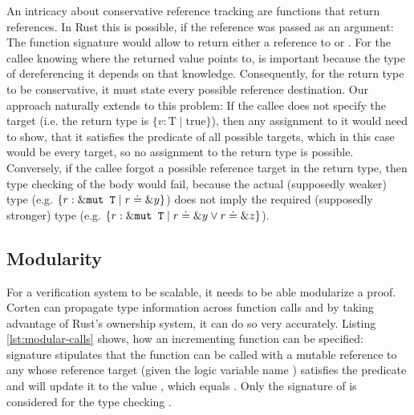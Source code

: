 \documentclass[twoside, english]{sdqthesis}
\theoremstyle{definition}
\begin{document}
An intricacy about conservative reference tracking are functions that return references. In Rust this is possible, if the reference was passed as an argument: The function signature  would allow  to return either a reference to  or . For the callee knowing where the returned value points to, is important because the type of dereferencing it depends on that knowledge. 
Consequently, for the return type to be conservative, it must state every possible reference destination.
Our approach naturally extends to this problem: If the callee does not specify the target (i.e. the return type is $\{ v : \text{T} \mid \text{true}\}$), then any assignment to it would need to show, that it satisfies the predicate of all possible targets, which in this case would be every target, so no assignment to the return type is possible.
Conversely, if the callee forgot a possible reference target in the return type, then type checking of the body would fail, because the actual (supposedly weaker) type (e.g. $\{ r : \&\code{mut T} \mid r \doteq \&y \}$) does not imply the required (supposedly stronger) type (e.g. $\{ r : \&\code{mut T} \mid r \doteq \&y \vee r \doteq \&z \}$).






\label{sec:modularity}\subsection{Modularity}

For a verification system to be scalable, it needs to be able modularize a proof. Corten can propagate type information across function calls and by taking advantage of Rust's ownership system, it can do so very accurately. Listing \ref{lst:modular-calls} shows, how an incrementing function  can be specified:  signature stipulates that the function can be called with a mutable reference to any  whose reference target (given the logic variable name ) satisfies the predicate  and will update it to the value , which equals . Only the signature of  is considered for the type checking . 
\end{document}
